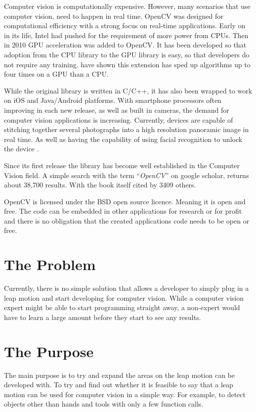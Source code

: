 \documentclass[11pt,oneside]{report}
\begin{document}
				Computer vision is computationally expensive.
				However, many scenarios that use computer vision, need to happen in real time.
				OpenCV was designed for computational efficiency with a strong focus on real-time applications.
				Early on in its life, Intel had pushed for the requirement of more power from CPUs.
				Then in 2010 GPU acceleration was added to OpenCV.
				It has been developed so that adoption from the CPU library to the GPU library is easy, so that developers do not require any training.
				 have shown this extension has sped up algorithms up to four times on a GPU than a CPU.
				
				While the original library is written in C/C++, it has also been wrapped to work on iOS and Java/Android platforms.
				With smartphone processors often improving in each new release, as well as built in cameras, the demand for computer vision applications is increasing.
				Currently, devices are capable of stitching together several photographs into a high resolution panoramic image in real time.
				As well as having the capability of using facial recognition to unlock the device \cite{journal:face}.
				
				Since its first release the library has become well established in the Computer Vision field.
				A simple search with the term ``\textit{OpenCV}'' on google scholar, returns about 38,700 results.
				With the  book itself cited by 3409 others.
				
				OpenCV is licensed under the BSD open source licence.
				Meaning it is open and free.
				The code can be embedded in other applications for research or for profit and there is no obligation that the created applications code needs to be open or free.
		\section{The Problem}
				Currently, there is no simple solution that allows a developer to simply plug in a leap motion and start developing for computer vision.
				While a computer vision expert might be able to start programming straight away, a non-expert would have to learn a large amount before they start to see any results.	
				
		\section{The Purpose}
				The main purpose is to try and expand the areas on the leap motion can be developed with.
				To try and find out whether it is feasible to say that a leap motion can be used for computer vision in a simple way.
				For example, to detect objects other than hands and tools with only a few function calls.
				
\end{document}
